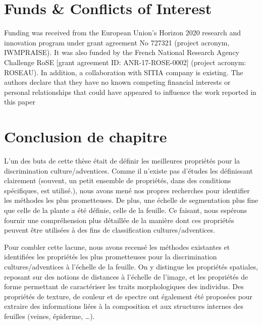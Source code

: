 \documentclass[../thesis.tex]{subfiles}
\begin{document}
    \section*{Funds \& Conflicts of Interest}  Funding was received from the European Union’s Horizon 2020 research and innovation program under grant agreement No 727321 (project acronym, IWMPRAISE). It was also funded by the French National Research Agency Challenge RoSE [grant agreement ID: ANR-17-ROSE-0002] (project acronym: ROSEAU). In addition, a collaboration with SITIA company is existing. The authors declare that they have no known competing financial interests or personal relationships that could have appeared to influence the work reported in this paper
    \vfill
    
	\newpage
	\section{Conclusion de chapitre}
    
    
    L'un des buts de cette thèse était de définir les meilleures propriétés pour la discrimination culture/adventices. Comme il n'existe pas d'études les définissant clairement (souvent, un petit ensemble de propriétés, dans des conditions spécifiques, est utilisé.), nous avons mené nos propres recherches pour identifier les méthodes les plus prometteuses. De plus, une échelle de segmentation plus fine que celle de la plante a été définie, celle de la feuille. Ce faisant, nous espérons fournir une compréhension plus détaillée de la manière dont ces propriétés peuvent être utilisées à des fins de classification cultures/adventices.
    
    Pour combler cette lacune, nous avons recensé les méthodes existantes et identifiées les propriétés les plus prometteuses pour la discrimination cultures/adventices à l'échelle de la feuille. On y distingue les propriétés spatiales, reposant sur des notions de distances à l'échelle de l'image, et les propriétés de forme permettant de caractériser les traits morphologiques des individus. Des propriétés de texture, de couleur et de spectre ont également été proposées pour extraire des informations liées à la composition et aux structures internes des feuilles (veines, épiderme, \dots).
    
\end{document}
